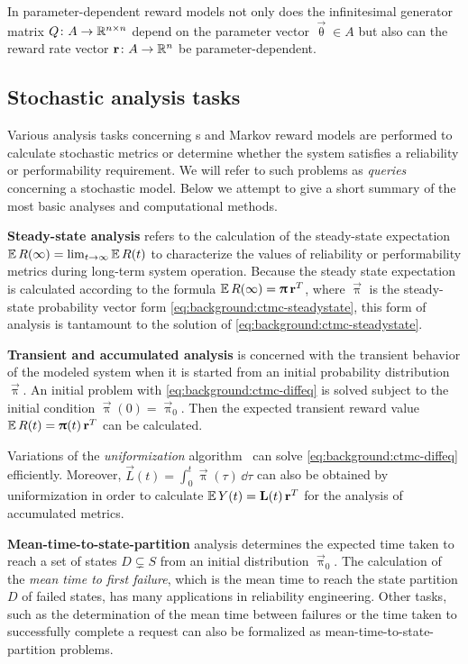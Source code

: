 In parameter-dependent reward models not only does the infinitesimal generator matrix \(Q\colon A \to \mathbb{R}^{n \times n}\) depend on the parameter vector \(\vec{\uptheta} \in A\) but also can the reward rate vector \(\bm{\mathrm{r}}\colon A \to \mathbb{R}^n\) be parameter-dependent.

\subsection{Stochastic analysis tasks}
\label{ssec:background:analysis}

Various analysis tasks concerning s and Markov reward models are performed to calculate stochastic metrics or determine whether the system satisfies a reliability or performability requirement. We will refer to such problems as \emph{queries} concerning a stochastic model. Below we attempt to give a short summary of the most basic analyses and computational methods.

\newpara \textbf{Steady-state analysis} refers to the calculation of the steady-state expectation \(\operatorname{\mathbb{E}} R(\infty) = \lim_{t \to \infty} \operatorname{\mathbb{E}} R(t)\) to characterize the values of reliability or performability metrics during long-term system operation. Because the steady state expectation is calculated according to the formula \(\operatorname{\mathbb{E}} R(\infty) = \bm{\mathrm{\uppi}} \, \bm{\mathrm{r}}^T\), where \(\vec{\uppi}\) is the steady-state probability vector form \vref{eq:background:ctmc-steadystate}, this form of analysis is tantamount to the solution of \cref{eq:background:ctmc-steadystate}.

\newpara \textbf{Transient and accumulated analysis} is concerned with the transient behavior of the modeled system when it is started from an initial probability distribution \(\vec{\uppi}\). An initial problem with \vref{eq:background:ctmc-diffeq} is solved subject to the initial condition \(\vec{\uppi}(0) = \vec{\uppi}_0\). Then the expected transient reward value \(\operatorname{\mathbb{E}} R(t) = \bm{\mathrm{\uppi}}(t) \, \bm{\mathrm{r}}^T\) can be calculated.

Variations of the \emph{uniformization} algorithm~ can solve \cref{eq:background:ctmc-diffeq} efficiently. Moreover, \(\vec{L}(t) = \int_{0}^{t} \vec{\uppi}(\tau) \,\dd\tau\) can also be obtained by uniformization in order to calculate \(\operatorname{\mathbb{E}} Y(t) = \bm{\mathrm{L}}(t) \, \bm{\mathrm{r}}^T\) for the analysis of accumulated metrics.

\newpara \textbf{Mean-time-to-state-partition} analysis determines the expected time taken to reach a set of states \(D \subsetneq S\) from an initial distribution \(\vec{\uppi}_0\). The calculation of the \emph{mean time to first failure}, which is the mean time to reach the state partition \(D\) of failed states, has many applications in reliability engineering. Other tasks, such as the determination of the mean time between failures or the time taken to successfully complete a request can also be formalized as mean-time-to-state-partition problems.

